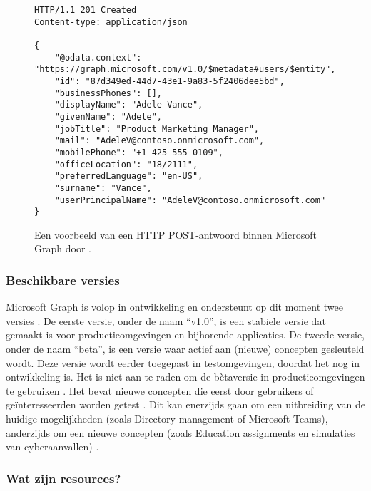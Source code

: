 \begin{figure}[h]
    \scriptsize
    \begin{verbatim}
HTTP/1.1 201 Created
Content-type: application/json

{
    "@odata.context": "https://graph.microsoft.com/v1.0/$metadata#users/$entity",
    "id": "87d349ed-44d7-43e1-9a83-5f2406dee5bd",
    "businessPhones": [],
    "displayName": "Adele Vance",
    "givenName": "Adele",
    "jobTitle": "Product Marketing Manager",
    "mail": "AdeleV@contoso.onmicrosoft.com",
    "mobilePhone": "+1 425 555 0109",
    "officeLocation": "18/2111",
    "preferredLanguage": "en-US",
    "surname": "Vance",
    "userPrincipalName": "AdeleV@contoso.onmicrosoft.com"
}
    \end{verbatim}    
    \caption[Voorbeeld Microsoft Graph POST-antwoord]{Een voorbeeld van een \ac{HTTP} POST-antwoord binnen Microsoft Graph door \textcite{Microsoft2022e}.}
    \label{MSPRES}
\end{figure}

\subsubsection{Beschikbare versies}


Microsoft Graph is volop in ontwikkeling en ondersteunt op dit moment twee versies \Autocite{Microsoft2023f}. De eerste versie, onder de naam “v1.0”, is een stabiele versie dat gemaakt is voor productieomgevingen en bijhorende applicaties. De tweede versie, onder de naam “beta”, is een versie waar actief aan (nieuwe) concepten gesleuteld wordt. Deze versie wordt eerder toegepast in testomgevingen, doordat het nog in ontwikkeling is. Het is niet aan te raden om de bètaversie in productieomgevingen te gebruiken \autocite{Microsoft2023vv}. Het bevat nieuwe concepten die eerst door gebruikers of geïnteresseerden worden getest \autocite{Microsoft2022e}. Dit kan enerzijds gaan om een uitbreiding van de huidige mogelijkheden (zoals Directory management of Microsoft Teams), anderzijds om een nieuwe concepten (zoals Education assignments en simulaties van cyberaanvallen) \autocite{Microsoft2023w}.

\subsubsection{Wat zijn resources?}


